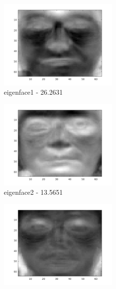 \documentclass[a4paper]{article}
\begin{document}
\begin{figure}[H]
    \begin{subfigure}[c]{0.24\textwidth}
        \centering
        \includegraphics[width=0.65\textwidth]{images/ex2_x1.png}
        \caption{eigenface1 - 26.2631}
        \label{subfig:ex2_x1}
    \end{subfigure}
    \begin{subfigure}[c]{0.24\textwidth}
        \centering
        \includegraphics[width=0.65\textwidth]{images/ex2_x2.png}
        \caption{eigenface2 - 13.5651}
        \label{subfig:ex2_x2}
    \end{subfigure}
    \begin{subfigure}[c]{0.24\textwidth}
        \centering
        \includegraphics[width=0.65\textwidth]{images/ex2_x3.png}

\end{subfigure}
\end{figure}
\end{document}
